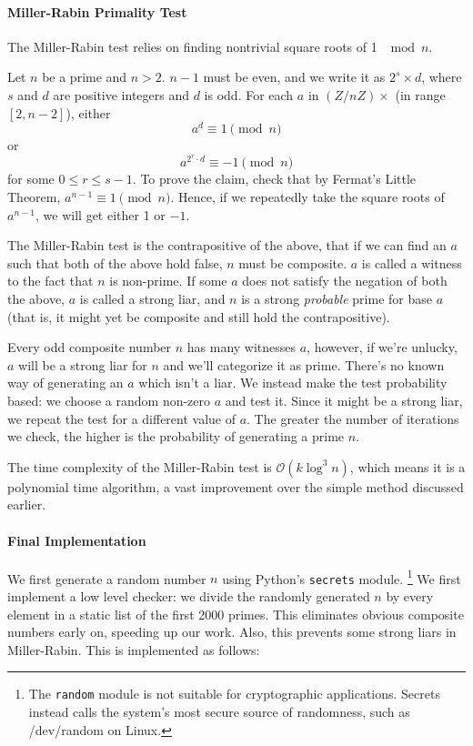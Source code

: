 \documentclass{article}
\begin{document}
\paragraph{Miller-Rabin Primality Test}
The Miller-Rabin test relies on finding nontrivial square roots of 1 $\mod{n}$.

Let $n$ be a prime and $n>2$. $n-1$ must be even, and we write it as $2^s\times d$, where $s$ and
$d$ are positive integers and $d$ is odd. For each $a$ in $(Z/nZ)\times$ (in range $[2, n-2]$),
either $$a^d \equiv 1 \pmod{n}$$ or $$a^{2^r\cdot d} \equiv -1 \pmod{n}$$ for some $0 \leq r \leq
s-1$. To prove the claim, check that by Fermat's Little Theorem, $a^{n-1} \equiv 1 \pmod{n}$. Hence,
if we repeatedly take the square roots of $a^{n-1}$, we will get either 1 or $-1$.

The Miller-Rabin test is the contrapositive of the above, that if we can find an $a$ such that both
of the above hold false, $n$ must be composite. $a$ is called a witness to the fact that $n$ is
non-prime. If some $a$ does not satisfy the negation of both the above, $a$ is called a strong liar,
and $n$ is a strong \emph{probable} prime for base $a$ (that is, it might yet be composite and still
hold the contrapositive).

Every odd composite number $n$ has many witnesses $a$, however, if we're unlucky, $a$ will be a strong
liar for $n$ and we'll categorize it as prime. There's no known way of generating an $a$ which isn't
a liar. We instead make the test probability based: we choose a random non-zero $a$ and test it.
Since it might be a strong liar, we repeat the test for a different value of $a$. The greater the
number of iterations we check, the higher is the probability of generating a prime $n$.

The time complexity of the Miller-Rabin test is $\mathcal{O} (k \log^3{n})$, which means it is a
polynomial time algorithm, a vast improvement over the simple method discussed earlier.

\paragraph{Final Implementation} We first generate a random number $n$ using Python's
\texttt{secrets} module. \footnote{The \texttt{random} module is not suitable for cryptographic
applications. Secrets instead calls the system's most secure source of randomness, such as /dev/random on
Linux.} We first implement a low level checker: we divide the randomly generated $n$ by every
element in a static list of the first 2000 primes. This eliminates obvious composite numbers early
on, speeding up our work. Also, this prevents some strong liars in Miller-Rabin. This is implemented
as follows:
\end{document}
